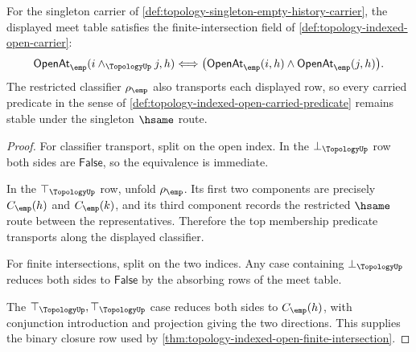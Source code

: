 \begin{theorem}
\label{thm:topology-singleton-finite-intersection-laws}
For the singleton carrier of \autoref{def:topology-singleton-empty-history-carrier}, the displayed meet table satisfies the finite-intersection field of \autoref{def:topology-indexed-open-carrier}:
$$
\mathsf{OpenAt}_{\emp}(i\wedge_{\TopologyUp}j,h)
\Longleftrightarrow
\bigl(\mathsf{OpenAt}_{\emp}(i,h)\wedge
\mathsf{OpenAt}_{\emp}(j,h)\bigr).
$$
The restricted classifier $\rho_{\emp}$ also transports each displayed row, so every carried predicate in the sense of \autoref{def:topology-indexed-open-carried-predicate} remains stable under the singleton $\hsame$ route.
\end{theorem}
\begin{proof}
For classifier transport, split on the open index. In the $\bot_{\TopologyUp}$ row both sides are $\mathsf{False}$, so the equivalence is immediate.

In the $\top_{\TopologyUp}$ row, unfold $\rho_{\emp}$. Its first two components are precisely $C_{\emp}(h)$ and $C_{\emp}(k)$, and its third component records the restricted $\hsame$ route between the representatives. Therefore the top membership predicate transports along the displayed classifier.

For finite intersections, split on the two indices. Any case containing $\bot_{\TopologyUp}$ reduces both sides to $\mathsf{False}$ by the absorbing rows of the meet table.

The $\top_{\TopologyUp},\top_{\TopologyUp}$ case reduces both sides to $C_{\emp}(h)$, with conjunction introduction and projection giving the two directions. This supplies the binary closure row used by \autoref{thm:topology-indexed-open-finite-intersection}.
\end{proof}

